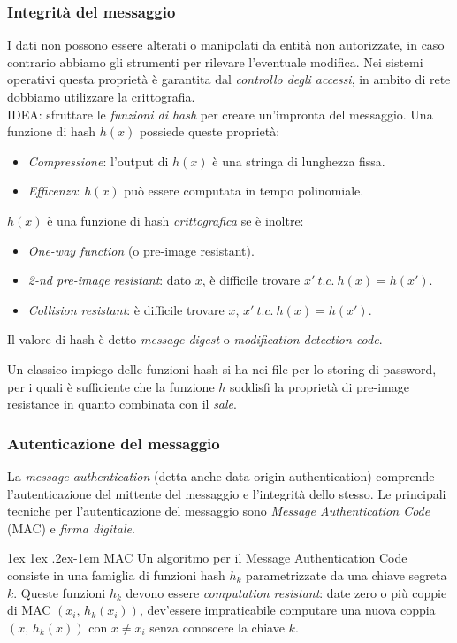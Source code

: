 \documentclass[a4paper, 11pt, notitlepage, fleqn]{report}
\makeatletter
\renewcommand{\paragraph}{%
	\@startsection{paragraph}{4}%
	{\z@}{1ex \@plus 1ex \@minus .2ex}{-1em}%
	{\normalfont\normalsize\bfseries}%
}
\makeatother
\begin{document}
\subsubsection{Integrità del messaggio}
I dati non possono essere alterati o manipolati da entità non autorizzate, in caso contrario abbiamo gli strumenti per rilevare l'eventuale modifica. Nei sistemi operativi questa proprietà è garantita dal \emph{controllo degli accessi}, in ambito di rete dobbiamo utilizzare la crittografia.\\
IDEA: sfruttare le \emph{funzioni di hash} per creare un'impronta del messaggio. Una funzione di hash $h(x)$ possiede queste proprietà:
\begin{itemize}
	\item \emph{Compressione}: l'output di $h(x)$ è una stringa di lunghezza fissa.
	\item \emph{Efficenza}: $h(x)$ può essere computata in tempo polinomiale.
\end{itemize}
$h(x)$ è una funzione di hash \emph{crittografica} se è inoltre:
\begin{itemize}
	\item \emph{One-way function} (o pre-image resistant).
	\item \emph{2-nd pre-image resistant}: dato $x$, è difficile trovare $x'\ t.c.\ h(x)=h(x')$.
	\item \emph{Collision resistant}: è difficile trovare $x,\,x'\ t.c.\ h(x)=h(x')$.
\end{itemize}
Il valore di hash è detto \emph{message digest} o \emph{modification detection code}.

Un classico impiego delle funzioni hash si ha nei file per lo storing di password, per i quali è sufficiente che la funzione $h$ soddisfi la proprietà di pre-image resistance in quanto combinata con il \emph{sale}.


\subsubsection{Autenticazione del messaggio}
La \emph{message authentication} (detta anche data-origin authentication) comprende l'autenticazione del mittente del messaggio e l'integrità dello stesso. Le principali tecniche per l'autenticazione del messaggio sono \emph{Message Authentication Code} (MAC) e \emph{firma digitale}.

\paragraph{MAC}
Un algoritmo per il Message Authentication Code consiste in una famiglia di funzioni hash $h_k$ parametrizzate da una chiave segreta $k$. Queste funzioni $h_k$ devono essere \emph{computation resistant}: date zero o più coppie di MAC $(x_i,\,h_k(x_i))$, dev'essere impraticabile computare una nuova coppia $(x,\,h_k(x))$ con $x\neq x_i$ senza conoscere la chiave $k$.
\end{document}
